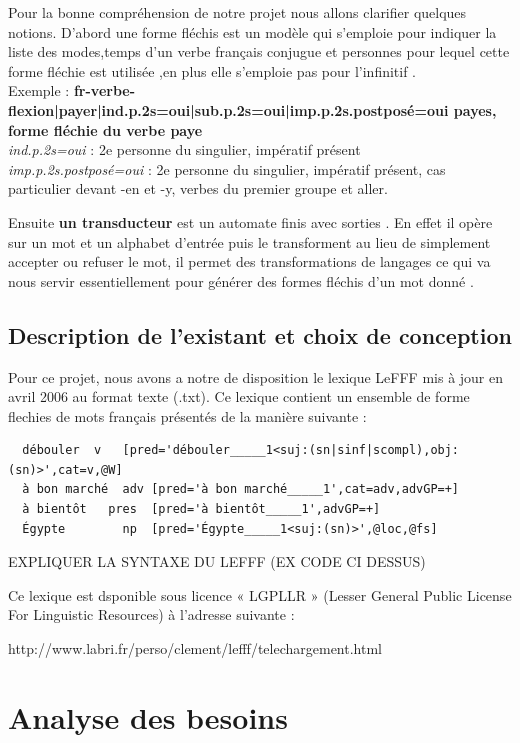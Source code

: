 \documentclass[12pt,a4paper]{article}
\begin{document}
 Pour la bonne compréhension de notre projet nous allons clarifier quelques notions. D'abord une forme fléchis est un modèle qui s'emploie pour indiquer la liste des modes,temps d'un verbe français conjugue et personnes pour lequel cette forme fléchie est utilisée ,en plus elle s'emploie pas pour l'infinitif .
\\ Exemple :
\textbf{{{fr-verbe-flexion|payer|ind.p.2s=oui|sub.p.2s=oui|imp.p.2s.postposé=oui}} payes,  \textbf{forme fléchie} du verbe paye }
\\  \textit{ ind.p.2s=oui} :  2e personne du singulier, impératif présent
\\  \textit{ imp.p.2s.postposé=oui} :   2e personne du singulier, impératif présent, cas particulier devant -en et -y, verbes du premier groupe et aller.

  Ensuite \textbf{un transducteur} est un automate finis avec sorties . En effet il opère sur un mot et un alphabet d'entrée puis le transforment au lieu de simplement accepter ou refuser le mot, il permet des transformations de langages ce qui va nous servir essentiellement pour générer des formes fléchis d'un mot donné .


\newpage
\subsection{Description de l'existant et choix de conception}

Pour ce projet, nous avons a notre de disposition le lexique LeFFF mis à jour en avril 2006 au format texte (.txt).
Ce lexique contient un ensemble de forme flechies de mots français présentés de la manière suivante :
\begin{verbatim}
  débouler	v	[pred='débouler_____1<suj:(sn|sinf|scompl),obj:(sn)>',cat=v,@W]
  à bon marché	adv	[pred='à bon marché_____1',cat=adv,advGP=+]
  à bientôt	  pres	[pred='à bientôt_____1',advGP=+]
  Égypte		np	[pred='Égypte_____1<suj:(sn)>',@loc,@fs]
\end{verbatim}

EXPLIQUER LA SYNTAXE DU LEFFF (EX CODE CI DESSUS)

Ce lexique est dsponible sous licence « LGPLLR » (Lesser General Public License For Linguistic Resources) à l'adresse suivante : 
\\ \begin{center}http://www.labri.fr/perso/clement/lefff/telechargement.html\end{center}

  \section{Analyse des besoins}
\end{document}
